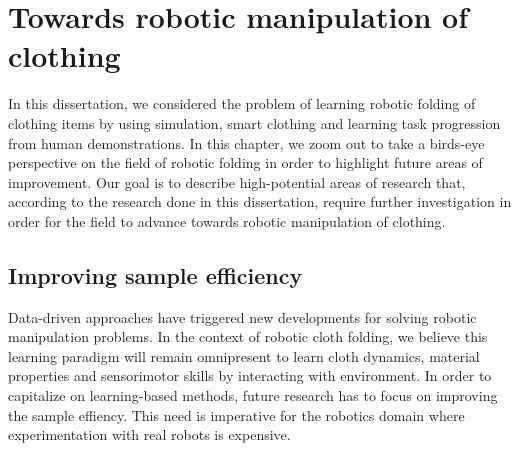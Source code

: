\documentclass[\home/main.tex]{subfiles}
\begin{document}

\chapter{Towards robotic manipulation of clothing}\label{ch:towards_robotic_folding}

In this dissertation, we considered the problem of learning robotic folding of clothing items by using simulation, smart clothing and learning task progression from human demonstrations. In this chapter, we zoom out to take a birds-eye perspective on the field of robotic folding in order to highlight future areas of improvement. Our goal is to describe high-potential areas of research that, according to the research done in this dissertation, require further investigation in order for the field to advance towards robotic manipulation of clothing.

\section{Improving sample efficiency}

Data-driven approaches have triggered new developments for solving robotic manipulation problems. In the context of robotic cloth folding, we believe this learning paradigm will remain omnipresent to learn cloth dynamics, material properties and sensorimotor skills by interacting with environment. In order to capitalize on learning-based methods, future research has to focus on improving the sample effiency. This need is imperative for the robotics domain where experimentation with real robots is expensive. 
\end{document}
